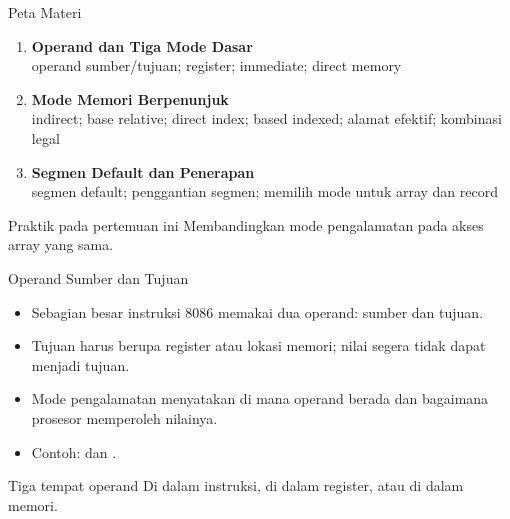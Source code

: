 \documentclass[aspectratio=169,11pt]{beamer}
\begin{document}
\begin{frame}{Peta Materi}
\small
\begin{enumerate}
    \item \textbf{Operand dan Tiga Mode Dasar}\\
          {\footnotesize operand sumber/tujuan; register; immediate;
          direct memory}

    \vspace{0.25em}
    \item \textbf{Mode Memori Berpenunjuk}\\
          {\footnotesize indirect; base relative; direct index;
          based indexed; alamat efektif; kombinasi legal}

    \vspace{0.25em}
    \item \textbf{Segmen Default dan Penerapan}\\
          {\footnotesize segmen default; penggantian segmen; memilih
          mode untuk array dan record}
\end{enumerate}

\vspace{0.35em}
\begin{block}{Praktik pada pertemuan ini}
\small Membandingkan mode pengalamatan pada akses array yang sama.
\end{block}
\end{frame}


\begin{frame}{Operand Sumber dan Tujuan}
\small
\begin{itemize}
    \item Sebagian besar instruksi 8086 memakai dua operand: sumber
          dan tujuan.

    \vspace{0.18em}
    \item Tujuan harus berupa register atau lokasi memori; nilai
          segera tidak dapat menjadi tujuan.

    \vspace{0.18em}
    \item Mode pengalamatan menyatakan di mana operand berada dan
          bagaimana prosesor memperoleh nilainya.

    \vspace{0.18em}
    \item Contoh:  dan .
\end{itemize}

\vspace{0.25em}
\begin{block}{Tiga tempat operand}
\small Di dalam instruksi, di dalam register, atau di dalam memori.
\end{block}
\end{frame}
\end{document}
